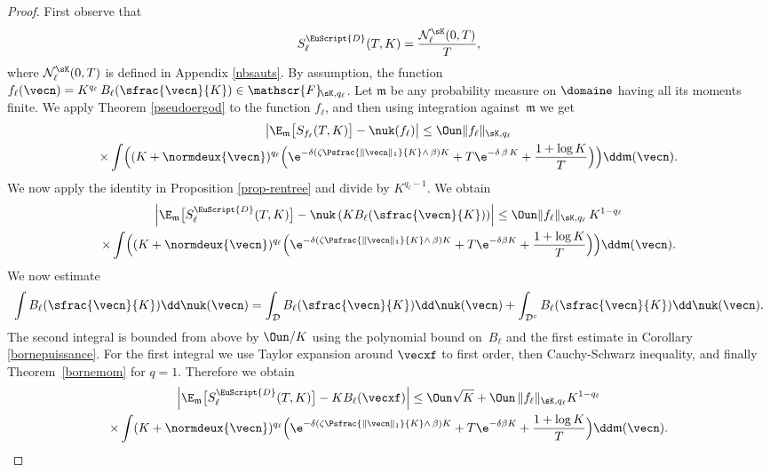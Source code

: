 \begin{proof}
First observe that
\[
S^{{ \EuScript{D}}}_{\ell}(T,K)=\frac{\mathcal{N}^{\sK}_\ell(0,T)}{T},
\]
where $\mathcal{N}^{\sK}_\ell(0,T)$ is defined in Appendix \ref{nbsauts}.
By assumption, the function $f_\ell(\vecn)=K^{q_\ell}\, B_\ell(\sfrac{\vecn}{K}) \in \mathscr{F}\!_{\sK,q_\ell}$.
Let $\mathfrak{m}$ be any probability measure on $\domaine$ having all its moments finite. We apply Theorem \ref{pseudoergod} to the function $f_\ell$, and then using integration against~$\mathfrak{m}$ we get
\begin{multline*}
\left| \E_{\mathfrak{m}}\bigl[S_{f_\ell}(T,K)\bigr] - \nuk(f_\ell)\right|
\leq \Oun \|f_\ell\|_{\sK,q_\ell}\\
\times\int \Bigl((K+\normdeux{\vecn})^{q_\ell}
\Bigl(\e^{-\delta\left(\zeta\Psfrac{\|\vecn\|_{1}}{K}\wedge\,\beta\right) K}
+T\e^{-\delta\,\beta\,K}+\frac{1+\log K}{T}\Bigr)\Bigr) \dd \mathfrak{m}(\vecn).
\end{multline*}
We now apply the identity in Proposition \ref{prop-rentree} and divide by $K^{q_\ell -1}$. We obtain
\begin{multline}
\label{boborne}
\left| \E_{\mathfrak{m}}\bigl[S^{{\EuScript{D}}}_{\ell}(T,K)\bigr] - \nuk\left(K B_\ell(\sfrac{\vecn}{K})\right) \right|
\leq \Oun\|f_\ell\|_{\sK,q_\ell}\, K^{1-q_\ell}\\
\times \int \Bigl((K+\normdeux{\vecn})^{q_\ell} \Bigl(\e^{-\delta\left(\zeta\Psfrac{\|\vecn\|_{1}}{K}\wedge\,\beta\right)K}+T\e^{-\delta \beta K}+\frac{1+\log K}{T}\Bigr)\Bigr) \dd\mathfrak{m}(\vecn).
\end{multline}
We now estimate
\[
\int B_\ell(\sfrac{\vecn}{K})\dd \nuk(\vecn)= \int_{\mathcal{D}} B_\ell(\sfrac{\vecn}{K}) \dd \nuk(\vecn)+
\int_{\mathcal{D}^c} B_\ell(\sfrac{\vecn}{K}) \dd \nuk(\vecn).
\]
The second integral is bounded from above by $\Oun/K$ using the polynomial bound on~$B_\ell$ and the first estimate in Corollary \ref{bornepuissance}.
For the first integral we use Taylor expansion around $\vecxf$ to first order, then Cauchy-Schwarz inequality, and finally Theorem~\ref{bornemom} for $q=1$. Therefore we obtain
\begin{multline}
\label{pasbeau}
\left|
\E_{\mathfrak{m}}\bigl[S^{{ \EuScript{D}}}_{\ell}(T,K)\bigr] - K B_\ell(\vecxf)\right|
\leq
\Oun \sqrt{K} +\Oun\, \|f_\ell\|_{\sK,q_\ell} K^{1-q_\ell}\\
\times \int (K+\normdeux{\vecn})^{q_\ell} \Bigl(\e^{-\delta\left(\zeta\Psfrac{\|\vecn\|_{1}}{K}\wedge\,\beta\right)K}
+T\e^{-\delta\beta K}+\frac{1+\log K}{T}\Bigr) \dd\mathfrak{m}(\vecn).

\end{multline}
\end{proof}
